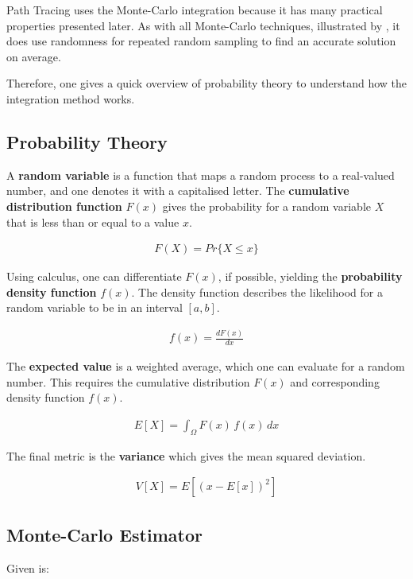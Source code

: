 Path Tracing uses the Monte-Carlo integration because it has many practical properties presented later.
As with all Monte-Carlo techniques, illustrated by \cite{kalos_monte_2008}, it does use randomness for repeated random sampling to find an accurate solution on average.

Therefore, one gives a quick overview of probability theory to understand how the integration method works.

\subsection*{Probability Theory}

A \textbf{random variable} is a function that maps a random process to a real-valued number, and one denotes it with a capitalised letter.
The \textbf{cumulative distribution function} $F(x)$ gives the probability for a random variable $X$ that is less than or equal to a value $x$.

\begin{align*}
    F(X)=Pr\{X\le x\}
\end{align*}

Using calculus, one can differentiate $F(x)$, if possible, yielding the \textbf{probability density function} $f(x)$.
The density function describes the likelihood for a random variable to be in an interval $[a,b]$.

\begin{align*}
    f(x)=\frac{dF(x)}{dx}
\end{align*}

The \textbf{expected value} is a weighted average, which one can evaluate for a random number.
This requires the cumulative distribution $F(x)$ and corresponding density function $f(x)$.

\begin{align*}
    E[X]=\int_{\Omega}F(x)\,f(x)\,dx
\end{align*}

The final metric is the \textbf{variance} which gives the mean squared deviation.

\begin{align*}
    V[X]=E\left[(x-E[x])^2\right]
\end{align*}

\subsection*{Monte-Carlo Estimator}

Given is:

